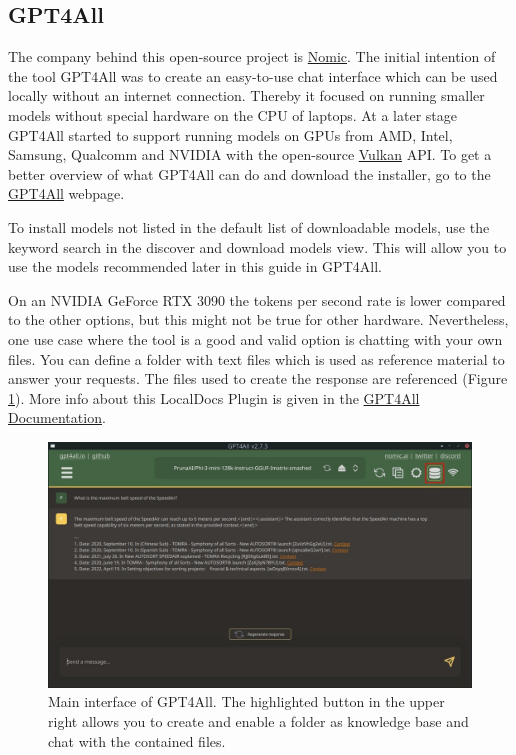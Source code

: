 \documentclass[parskip=half]{scrreprt} %
\begin{document}
\subsection{GPT4All}
The company behind this open-source project is \href{https://home.nomic.ai}{Nomic}.
The initial intention of the tool GPT4All was to create an easy-to-use chat interface which can be used locally without an internet connection.
Thereby it focused on running smaller models without special hardware on the CPU of laptops.
At a later stage GPT4All started to support running models on GPUs from AMD, Intel, Samsung, Qualcomm and NVIDIA with the open-source \href{https://www.vulkan.org/tools#vulkan-gpu-resources}{Vulkan} API.
To get a better overview of what GPT4All can do and download the installer, go to the \href{https://gpt4all.io/index.html}{GPT4All} webpage.

To install models not listed in the default list of downloadable models, use the keyword search in the discover and download models view. This will allow you to use the models recommended later in this guide in GPT4All.

On an NVIDIA GeForce RTX 3090 the tokens per second rate is lower compared to the other options, but this might not be true for other hardware.
Nevertheless, one use case where the tool is a good and valid option is chatting with your own files.
You can define a folder with text files which is used as reference material to answer your requests.
The files used to create the response are referenced (Figure \ref{fig:gpt4all}).
More info about this LocalDocs Plugin is given in the \href{https://docs.gpt4all.io/gpt4all_chat.html}{GPT4All Documentation}.

\begin{figure}[h]
	\includegraphics[width=\textwidth]{GPT4All v2.7.3}
	\caption{Main interface of GPT4All. The highlighted button in the upper right allows you to create and enable a folder as knowledge base and chat with the contained files.}
	\centering
	\label{fig:gpt4all}
\end{figure}
\end{document}
